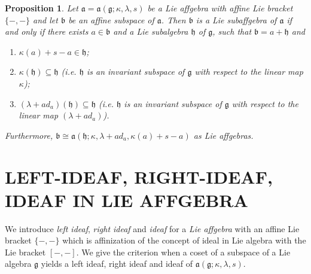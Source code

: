 \documentclass{article}
\newtheorem{proposition}[theorem]{Proposition}
\theoremstyle{definition}
\theoremstyle{remark}
\theoremstyle{plain}
\begin{document}
\begin{proposition}\cite{And2}
    Let $\mathfrak{a}=\mathfrak{a}(\mathfrak{g}; \kappa, \lambda, s)$ be a Lie affgebra with affine Lie bracket $\{-, -\}$ and let $\mathfrak{b}$ be an affine subspace of $\mathfrak{a}$. Then $\mathfrak{b}$ is a Lie subaffgebra of $\mathfrak{a}$ if and only if there exists $a\in \mathfrak{b}$ and a Lie subalgebra $\mathfrak{h}$ of $\mathfrak{g}$, such that $\mathfrak{b}=a+\mathfrak{h}$ and 
        \begin{enumerate}
            \item $\kappa(a)+s-a \in \mathfrak{h}$;
            \item $\kappa(\mathfrak{h})\subseteq \mathfrak{h} $ (i.e. $\mathfrak{h}$ is an invariant subspace of $\mathfrak{g}$ with respect to the linear map $\kappa$);
            
            \item $(\lambda + ad_{a}) (\mathfrak{h})\subseteq \mathfrak{h}$ (i.e. $\mathfrak{h}$ is an invariant subspace of $\mathfrak{g}$ with respect to the linear map $(\lambda + ad_{a})$).
        \end{enumerate}
        Furthermore, $\mathfrak{b} \cong \mathfrak{a}(\mathfrak{h}; \kappa, \lambda + ad_{a}, \kappa(a)+s-a)$
        as Lie affgebras.
\end{proposition}



\section{LEFT-IDEAF, RIGHT-IDEAF, IDEAF IN LIE AFFGEBRA}


We introduce \emph{left ideaf}, \emph{right ideaf} and \emph{ideaf} for a \emph{Lie affgebra} with an affine Lie bracket $\{-, - \}$ which is affinization of the concept of ideal in Lie algebra with the Lie bracket $[-, -]$. We give the criterion when a coset of a subspace of a Lie algebra $\mathfrak{g}$ yields a left ideaf, right ideaf and ideaf of $\mathfrak{a}(\mathfrak{g}; \kappa, \lambda, s)$.
\end{document}
